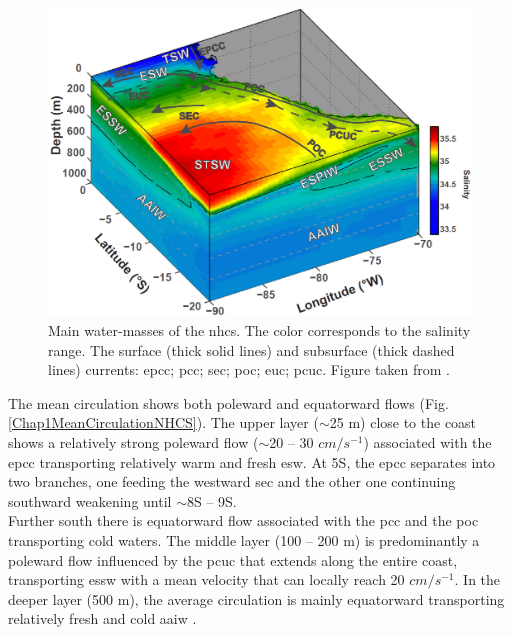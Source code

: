 \begin{figure}[ht]
	\includegraphics[width=1.0\textwidth]{figures/Chap1WaterMassesNHCS.png}
	\centering
	\caption{Main water-masses of the \acrshort{nhcs}. The color corresponds to the salinity range. The surface (thick solid lines) and subsurface (thick dashed lines) currents: \acrfull{epcc}; \acrfull{pcc}; \acrfull{sec}; \acrfull{poc}; \acrfull{euc}; \acrfull{pcuc}. Figure taken from \cite{GradChai2018}.}
	\label{Chap1WaterMassesNHCS}
\end{figure}

The mean circulation shows both poleward and equatorward flows (Fig. \ref{Chap1MeanCirculationNHCS}). The upper layer ($\sim$25 m) close to the coast shows a relatively strong poleward flow ($\sim$20 – 30 $cm/s^{-1}$) associated with the \acrshort{epcc} transporting relatively warm and fresh \acrshort{esw}. At 5\textdegree S, the \acrshort{epcc} separates into two branches, one feeding the westward \acrshort{sec} and the other one continuing southward weakening until $\sim$8\textdegree S – 9\textdegree S.\\

Further south there is equatorward flow associated with the \acrshort{pcc} and the \acrshort{poc} transporting cold waters. The middle layer (100 – 200 m) is predominantly a poleward flow influenced by the \acrshort{pcuc} that extends along the entire coast, transporting \acrshort{essw} with a mean velocity that can locally reach 20 $cm/s^{-1}$. In the deeper layer (500 m), the average circulation is mainly equatorward transporting relatively fresh and cold \acrshort{aaiw} \citep{ChaiDomi2013,PietTest2013}.\\

